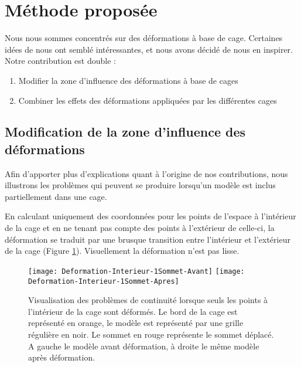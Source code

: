 \section{Méthode proposée}

Nous nous sommes concentrés sur des déformations à base de cage. Certaines
idées de \cite{GPCP13} nous ont semblé intéressantes, et nous avons décidé de
nous en inspirer. Notre contribution est double :

\begin{enumerate}

\item Modifier la zone d'influence des déformations à base de cages

\item Combiner les effets des déformations appliquées par les différentes
cages

\end{enumerate}

\subsection{Modification de la zone d'influence des déformations}

Afin d'apporter plus d'explications quant à l'origine de nos contributions,
nous illustrons les problèmes qui peuvent se produire lorsqu'un modèle est
inclus partiellement dans une cage.

En calculant uniquement des coordonnées pour les points de l'espace à
l'intérieur de la cage et en ne tenant pas compte des points à l'extérieur de
celle-ci, la déformation se traduit par une brusque transition entre
l'intérieur et l'extérieur de la cage (Figure \ref{MELVI}). Visuellement la
déformation n'est pas lisse.

\begin{figure}[ht]
  \begin{center}
    \scalebox{0.2}
    {
      \texttt{[image: Deformation-Interieur-1Sommet-Avant]}
      \texttt{[image: Deformation-Interieur-1Sommet-Apres]}
    }

    \caption[Problème de continuité déformation naïve] {Visualisation des
problèmes de continuité lorsque seuls les points à l'intérieur de la cage sont
déformés. Le bord de la cage est représenté en orange, le modèle est
représenté par une grille régulière en noir. Le sommet en rouge représente le
sommet déplacé. A gauche le modèle avant déformation, à droite le même modèle
après déformation.}

    \label{MELVI}
  \end{center}
\end{figure}


